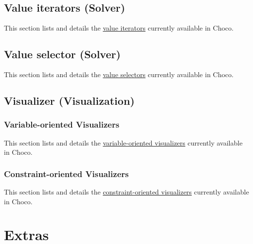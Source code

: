 \chapter{Value iterators (Solver)}\label{ch:valite}\hypertarget{ch:valite}{}
This section lists and details the \hyperlink{solver:valueiterator}{value iterators} currently available in Choco.





\chapter{Value selector (Solver)}\label{ch:valsel}\hypertarget{ch:valsel}{}
This section lists and details the \hyperlink{solver:valueselector}{value selectors} currently available in Choco.





%






\chapter{Visualizer (Visualization)}\label{ch:visualizer}\hypertarget{ch:visualizer}{}
\section{Variable-oriented Visualizers}\label{vov:visualizers}\hypertarget{vov:visualizers}{}
This section lists and details the \hyperlink{chocoandcpviz:visualizers}{variable-oriented visualizers} currently available in Choco.







\section{Constraint-oriented Visualizers}\label{cov:visualizers}\hypertarget{cov:visualizers}{}
This section lists and details the \hyperlink{chocoandcpviz:visualizers}{constraint-oriented visualizers} currently available in Choco.










\part{Extras}\label{ch:extra}\hypertarget{ch:extra}{}
%

